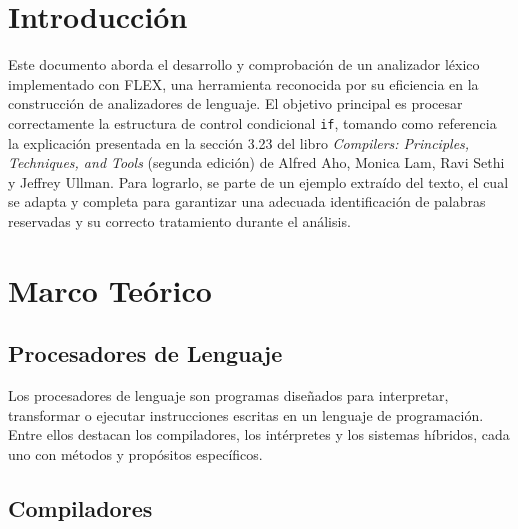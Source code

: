 \documentclass{article}
\begin{document}


\section{Introducción}\label{sec:intr}

Este documento aborda el desarrollo y comprobación de un analizador léxico implementado con FLEX, una herramienta reconocida por su eficiencia en la construcción de analizadores de lenguaje. El objetivo principal es procesar correctamente la estructura de control condicional \texttt{if}, tomando como referencia la explicación presentada en la sección 3.23 del libro \textit{Compilers: Principles, Techniques, and Tools} (segunda edición) de Alfred Aho, Monica Lam, Ravi Sethi y Jeffrey Ullman. Para lograrlo, se parte de un ejemplo extraído del texto, el cual se adapta y completa para garantizar una adecuada identificación de palabras reservadas y su correcto tratamiento durante el análisis.

\section{Marco Teórico}\label{sec:marc}

\subsection*{Procesadores de Lenguaje}

Los procesadores de lenguaje son programas diseñados para interpretar, transformar o ejecutar instrucciones escritas en un lenguaje de programación. Entre ellos destacan los compiladores, los intérpretes y los sistemas híbridos, cada uno con métodos y propósitos específicos.

\subsection*{Compiladores}
\end{document}
